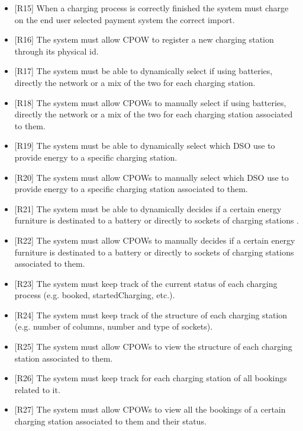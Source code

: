 \documentclass[a4paper]{report}
\begin{document}
\begin{itemize}
    \item{[R15]} \label{R15} When a charging process is correctly finished the system must charge on the end user selected payment system the correct import.
    \item{[R16]} \label{R16} The system must allow CPOW to register a new charging station through its physical id.
    \item{[R17]} \label{R17} The system must be able to dynamically select if using batteries, directly the network or a mix of the two for each charging station. 
    \item{[R18]} \label{R18} The system must allow CPOWs to manually select if using batteries, directly the network or a mix of the two for each charging station associated to them. 
    \item{[R19]} \label{R19} The system must be able to dynamically select which DSO use to provide energy to a specific charging station.
    \item{[R20]} \label{R20} The system must allow CPOWs to manually select which DSO use to provide energy to a specific charging station associated to them.
    \item{[R21]} \label{R21} The system must be able to dynamically decides if a certain energy furniture is destinated to a battery or directly to sockets of charging stations .
    \item{[R22]} \label{R22} The system must allow CPOWs to manually decides if a certain energy furniture is destinated to a battery or directly to sockets of charging stations associated to them.
    \item{[R23]} \label{R23} The system must keep track of the current status of each charging process (e.g. booked, startedCharging, etc.).
    \item{[R24]} \label{R24} The system must keep track of the structure of each charging station (e.g. number of columns, number and type of sockets).
    \item{[R25]} \label{R25} The system must allow CPOWs to view the structure of each charging station associated to them.
    \item{[R26]} \label{R26} The system must keep track for each charging station of all bookings related to it.
    \item{[R27]} \label{R27} The system must allow CPOWs to view all the bookings of a certain charging station associated to them and their status.
\end{itemize}
\end{document}
